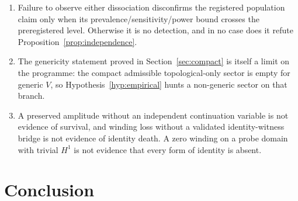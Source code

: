 \documentclass[11pt]{article}
\theoremstyle{definition}
\begin{document}
\begin{enumerate}[leftmargin=2.2em]
        sensitivity, eligibility-conditioning and sampling premises.  Its
        falsifier measures the registered detection count \(K_q\) and uses
        the displayed lower-tail threshold; it does not treat finite
        non-observation as the logical negation of existence.  Invalid phase,
        provenance, unit matching, eligibility law or exchangeability
        premises are non-applicability.
  \item Failure to observe either dissociation disconfirms the registered
        population claim only when its prevalence/sensitivity/power bound
        crosses the preregistered level.  Otherwise it is no detection, and
        in no case does it refute Proposition~\ref{prop:independence}.
  \item The genericity statement proved in
        Section~\ref{sec:compact} is itself a limit on the programme: the
        compact admissible topological-only sector is empty for generic \(V\),
        so
        Hypothesis~\ref{hyp:empirical} hunts a non-generic sector on that
        branch.
  \item A preserved amplitude without an independent continuation
        variable is not evidence of survival, and winding loss without a
        validated identity-witness bridge is not evidence of identity
        death.  A zero winding on a probe domain with trivial \(H^1\) is
        not evidence that every form of identity is absent.
\end{enumerate}

\section{Conclusion}
\end{document}
